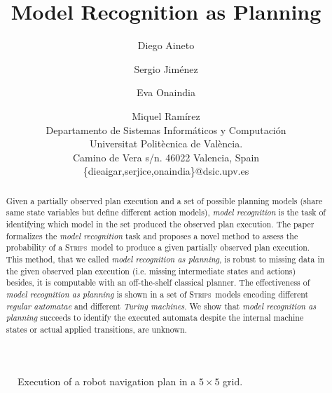\documentclass[letterpaper]{article} %
\newcommand{\strips}{\textsc{Strips}}     %
\begin{document}
\title{Model Recognition as Planning}

\author{Diego Aineto\and Sergio Jim\'enez\and Eva Onaindia \and Miquel Ram\'irez\\
{\small Departamento de Sistemas Inform\'aticos y Computaci\'on}\\
{\small Universitat Polit\`ecnica de Val\`encia.}\\
{\small Camino de Vera s/n. 46022 Valencia, Spain}\\
{\small \{dieaigar,serjice,onaindia\}@dsic.upv.es}}



\maketitle
\begin{abstract} 
Given a partially observed plan execution and a set of possible planning models (share same state variables but define different action models), {\em model recognition} is the task of identifying which model in the set produced the observed plan execution. The paper formalizes the {\em model recognition} task and proposes a novel method to assess the probability of a \strips\ model to produce a given partially observed plan execution. This method, that we called {\em model recognition as planning}, is robust to missing data in the given observed plan execution (i.e. missing intermediate states and actions) besides, it is computable with an off-the-shelf classical planner. The effectiveness of {\em model recognition as planning} is shown in a set of \strips\ models encoding different {\em regular automatae} and different {\em Turing machines}. We show that {\em model recognition as planning} succeeds to identify the executed automata despite the internal machine states or actual applied transitions, are unknown.
\end{abstract}


\begin{figure}
  \begin{scriptsize}
  \begin{center}
  \end{center}
  \end{scriptsize}  
 \caption{\small Execution of a robot navigation plan in a $5\times 5$ grid.}
\label{fig:grid-example}
\end{figure}
\end{document}

